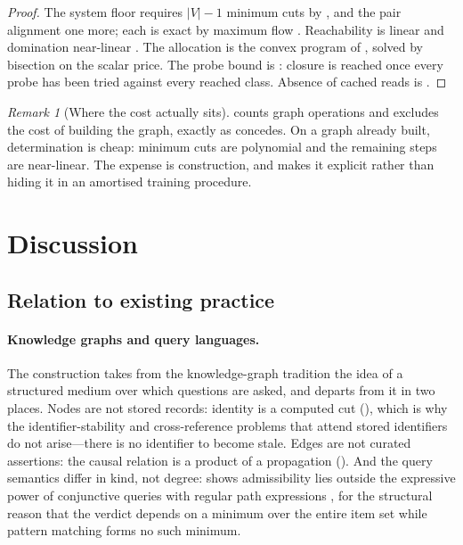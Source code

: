 \documentclass[11pt,twocolumn,a4paper]{article}
\theoremstyle{dirthm}
\theoremstyle{definition}
\theoremstyle{remark}
\newtheorem{remark}[theorem]{Remark}
\newcommand{\V}{V}
\newcommand{\abs}[1]{\lvert#1\rvert}
\begin{document}
\begin{proof}
The system floor requires $\abs{\V}-1$ minimum cuts by
, and the pair alignment one more; each is exact by
maximum flow \citep{fordfulkerson1956,edmondskarp1972,stoer1997}. Reachability
is linear \citep{tarjan1972} and domination near-linear
\citep{lengauer1979}. The allocation is the convex program of
, solved by bisection on the scalar price. The probe
bound is : closure is reached once every probe has been
tried against every reached class. Absence of cached reads is
.
\end{proof}

\begin{remark}[Where the cost actually sits]
\label{rem:cost-sits}
 counts graph operations and excludes the cost of
building the graph, exactly as  concedes. On a
graph already built, determination is cheap: minimum cuts are polynomial and
the remaining steps are near-linear. The expense is construction, and
 makes it explicit rather than hiding it in an amortised
training procedure.
\end{remark}


\section{Discussion}
\label{sec:discussion}

\subsection{Relation to existing practice}

\paragraph{Knowledge graphs and query languages.}
The construction takes from the knowledge-graph tradition
\citep{hogan2021,smith2007} the idea of a structured medium over which
questions are asked, and departs from it in two places. Nodes are not stored
records: identity is a computed cut (), which is why the
identifier-stability and cross-reference problems that attend stored
identifiers \citep{wren2008,mcmurry2017} do not arise---there is no identifier
to become stale. Edges are not curated assertions: the causal relation is a
product of a propagation (). And the query semantics
differ in kind, not degree:  shows admissibility
lies outside the expressive power of conjunctive queries with regular path
expressions \citep{perez2009,angles2017}, for the structural reason that the
verdict depends on a minimum over the entire item set while pattern matching
forms no such minimum.
\end{document}
